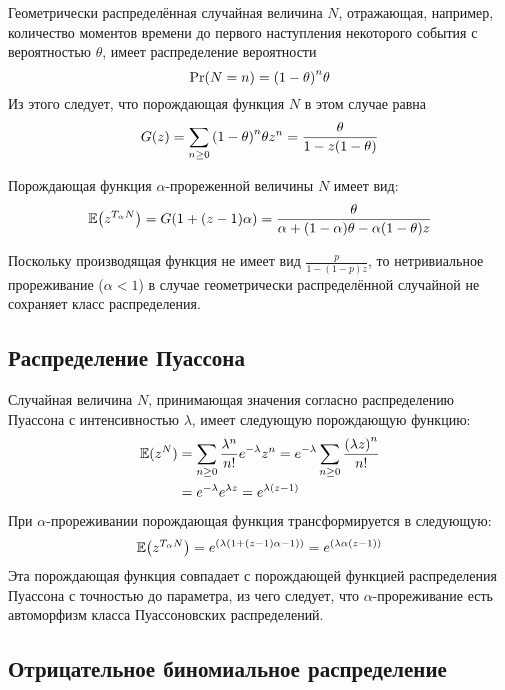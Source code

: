 \documentclass[a4paper]{article}
\let\originalleft\left
\let\originalright\right
\renewcommand{\left}{\mathopen{}\mathclose\bgroup\originalleft}
\renewcommand{\right}{\aftergroup\egroup\originalright}
\newcommand{\brac}[1]{{\left ( #1 \right )}}
\newcommand{\Ex}[0]{{\mathbb{E}}}
\begin{document}
Геометрически распределённая случайная величина $N$, отражающая, например,
количество моментов времени до первого наступления некоторого события с вероятностью $\theta$, имеет
распределение вероятности
\[\Pr(N=n) = \brac{1-\theta}^n \theta \]
Из этого следует, что порождающая функция $N$ в этом случае равна
\[G(z) = \sum_{n\geq 0} \brac{1-\theta}^n \theta z^n = \frac{\theta}{1 - z (1-\theta)}\]

Порождающая функция $\alpha$-прореженной величины $N$ имеет вид:
\[ \Ex\brac{z^{T_\alpha N}} = G\brac{1 + (z-1) \alpha}
= \frac{\theta}{\alpha + (1-\alpha) \theta - \alpha (1-\theta) z }\]

Поскольку производящая функция не имеет вид $\frac{p}{1-(1-p)z}$, то
нетривиальное прореживание ($\alpha < 1$) в случае геометрически
распределённой случайной не сохраняет класс распределения.


\subsection{Распределение Пуассона} %
\label{sub:Poisson_distribution}

Случайная величина $N$, принимающая значения согласно распределению Пуассона с
интенсивностью $\lambda$, имеет следующую порождающую функцию:
\begin{align*}
	\Ex(z^N) & = \sum_{n\geq 0} \frac{\lambda^n}{n!} e^{-\lambda} z^n
	= e^{-\lambda} \sum_{n\geq 0} \frac{\brac{\lambda z}^n}{n!} \\
	& = e^{-\lambda} e^{\lambda z} = e^{\lambda (z-1) }
\end{align*}
При $\alpha$-прореживании порождающая функция трансформируется в следующую:
\[\Ex\brac{z^{T_\alpha N}} = e^\brac{\lambda \brac{1 + (z-1) \alpha-1}} = e^\brac{\lambda \alpha (z-1)}\]
Эта порождающая функция совпадает с порождающей функцией распределения
Пуассона с точностью до параметра, из чего следует, что $\alpha$-прореживание
есть автоморфизм класса Пуассоновских распределений.


\subsection{Отрицательное биномиальное распределение} %
\label{sub:negative_binomial}
\end{document}
